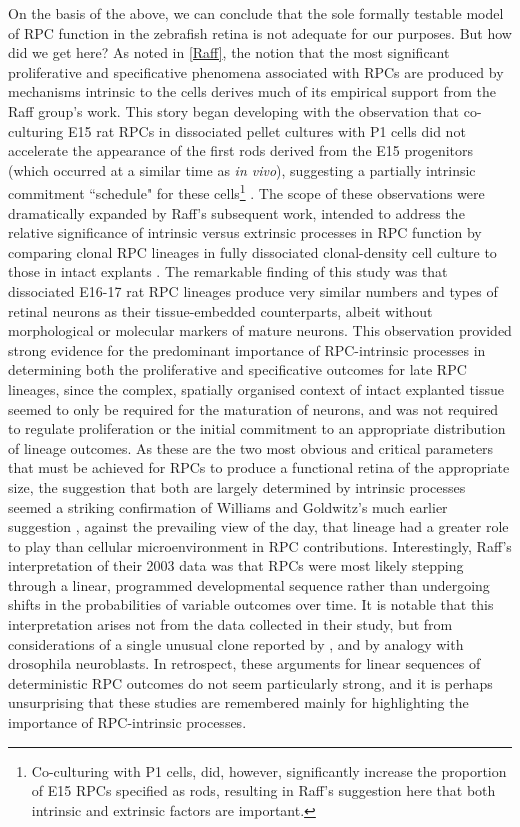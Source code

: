 On the basis of the above, we can conclude that the sole formally testable model of RPC function in the zebrafish retina is not adequate for our purposes. But how did we get here? As noted in \autoref{Raff}, the notion that the most significant proliferative and specificative phenomena associated with RPCs are produced by mechanisms intrinsic to the cells derives much of its empirical support from the Raff group's work. This story began developing with the observation that co-culturing E15 rat RPCs in dissociated pellet cultures with P1 cells did not accelerate the appearance of the first rods derived from the E15 progenitors (which occurred at a similar time as \textit{in vivo}), suggesting a partially intrinsic commitment ``schedule" for these cells\footnote{Co-culturing with P1 cells, did, however, significantly increase the proportion of E15 RPCs specified as rods, resulting in Raff's suggestion here that both intrinsic and extrinsic factors are important.} \cite{Watanabe1990}. The scope of these observations were dramatically expanded by Raff's subsequent work, intended to address the relative significance of intrinsic versus extrinsic processes in RPC function by comparing clonal RPC lineages in fully dissociated clonal-density cell culture to those in intact explants \cite{Cayouette2003}. The remarkable finding of this study was that dissociated E16-17 rat RPC lineages produce very similar numbers and types of retinal neurons as their tissue-embedded counterparts, albeit without morphological or molecular markers of mature neurons. This observation provided strong evidence for the predominant importance of RPC-intrinsic processes in determining both the proliferative and specificative outcomes for late RPC lineages, since the complex, spatially organised context of intact explanted tissue seemed to only be required for the maturation of neurons, and was not required to regulate proliferation or the initial commitment to an appropriate distribution of lineage outcomes. As these are the two most obvious and critical parameters that must be achieved for RPCs to produce a functional retina of the appropriate size, the suggestion that both are largely determined by intrinsic processes seemed a striking confirmation of Williams and Goldwitz's much earlier suggestion \cite{Williams1992}, against the prevailing view of the day, that lineage had a greater role to play than cellular microenvironment in RPC contributions. Interestingly, Raff's interpretation of their 2003 data was that RPCs were most likely stepping through a linear, programmed developmental sequence rather than undergoing shifts in the probabilities of variable outcomes over time. It is notable that this interpretation arises not from the data collected in their study, but from considerations of a single unusual clone reported by \cite{Turner1990}, and by analogy with drosophila neuroblasts. In retrospect, these arguments for linear sequences of deterministic RPC outcomes do not seem particularly strong, and it is perhaps unsurprising that these studies are remembered mainly for highlighting the importance of RPC-intrinsic processes.

